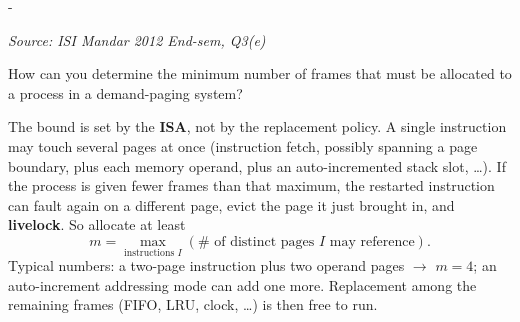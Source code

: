 \documentclass[11pt,a4paper]{article}
\makeatletter
\newcommand{\keepspace}[1]{\par\penalty-100\begingroup
  \setlength{\dimen@}{#1}\dimen@ii\pagegoal\advance\dimen@ii-\pagetotal
  \ifdim\dimen@>\dimen@ii\ifdim\dimen@ii>\z@\vfil\fi\break\fi\endgroup}
\newcounter{qn}[section]
\newenvironment{Qn}[4]{%
  \refstepcounter{qn}\keepspace{7\baselineskip}%
  \begin{tcolorbox}[qboxstyle, title={Q\thesection.\theqn\ \ [#1 \textbar\ #2]\ \ #4}]%
  {\footnotesize\color{g3}\textit{Source: #3}}\par\smallskip%
}{%
  \end{tcolorbox}%
}
\newenvironment{Sol}{%
  \begin{tcolorbox}[sboxstyle, title={Solution}]%
}{%
  \end{tcolorbox}\vspace{0.35em}%
}
\makeatother
\begin{document}
\begin{Qn}{Medium}{Lect 15}{ISI Mandar 2012 End-sem, Q3(e)}{Minimum frames a demand-paged process must be given}
How can you determine the minimum number of frames that must be
allocated to a process in a demand-paging system?
\end{Qn}
\begin{Sol}
The bound is set by the \textbf{ISA}, not by the replacement policy.
A single instruction may touch several pages at once (instruction
fetch, possibly spanning a page boundary, plus each memory operand,
plus an auto-incremented stack slot, \ldots). If the process is given
fewer frames than that maximum, the restarted instruction can fault
again on a different page, evict the page it just brought in, and
\textbf{livelock}. So allocate at least
\[
  m = \max_{\text{instructions }I}(\#\text{ of distinct pages }I\text{ may reference}).
\]
Typical numbers: a two-page instruction plus two operand pages $\to$
$m=4$; an auto-increment addressing mode can add one more. Replacement
among the remaining frames (FIFO, LRU, clock, \ldots) is then free to
run.
\end{Sol}
\end{document}
